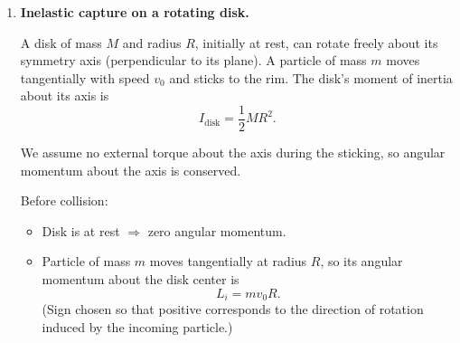 \documentclass[../main.tex]{subfiles}
\begin{document}
\begin{enumerate}
\begin{enumerate}
    Solve for $v(x)$:
    \[
    v^2(x)
    = \frac{2k}{m} \left( \frac{1}{\sqrt{x^2 + a^2}} - \frac{1}{\sqrt{x_0^2 + a^2}} \right),
    \]
    \[
    v(x)
    = \sqrt{ \frac{2k}{m} \left( \frac{1}{\sqrt{x^2 + a^2}} - \frac{1}{\sqrt{x_0^2 + a^2}} \right) }.
    \]

    Note: the expression in parentheses must be nonnegative for real $v$. Since the particle starts at $x_0>0$ and is attracted toward $x=0$, $x$ will decrease from $x_0$ toward $0$, and $1/\sqrt{x^2+a^2}$ increases as $|x|$ decreases.

    \item \textit{Maximum speed.}

    The speed increases as the particle moves to where the kinetic energy is largest. From the expression above, $v^2(x)$ is largest when
    \[
    \frac{1}{\sqrt{x^2 + a^2}}
    \quad\text{is largest.}
    \]
    That happens at the smallest possible $\sqrt{x^2+a^2}$, i.e. at $x=0$ (symmetric force will then decelerate it once it passes through and climbs ``up'' on the other side).

    Thus the maximum speed $v_{\max}$ occurs at $x=0$:
    \[
    v_{\max}^2
    = \frac{2k}{m} \left(
    \frac{1}{\sqrt{0 + a^2}} - \frac{1}{\sqrt{x_0^2 + a^2}}
    \right)
    = \frac{2k}{m} \left(
    \frac{1}{a} - \frac{1}{\sqrt{x_0^2 + a^2}}
    \right).
    \]

    Therefore
    \[
    v_{\max}
    = \sqrt{
    \frac{2k}{m} \left(
    \frac{1}{a} - \frac{1}{\sqrt{x_0^2 + a^2}}
    \right)
    }.
    \]

    Interpretation: the force pulls the particle toward the origin like a softened $1/r^2$-type attraction; the speed peaks at the center.
\end{enumerate}


\item \textbf{Inelastic capture on a rotating disk.}

A disk of mass $M$ and radius $R$, initially at rest, can rotate freely about its symmetry axis (perpendicular to its plane). A particle of mass $m$ moves tangentially with speed $v_0$ and sticks to the rim. The disk's moment of inertia about its axis is
\[
I_{\text{disk}} = \frac{1}{2} M R^2.
\]

We assume no external torque about the axis during the sticking, so angular momentum about the axis is conserved.

Before collision:
\begin{itemize}
\item Disk is at rest $\Rightarrow$ zero angular momentum.
\item Particle of mass $m$ moves tangentially at radius $R$, so its angular momentum about the disk center is
\[
L_i = m v_0 R.
\]
(Sign chosen so that positive corresponds to the direction of rotation induced by the incoming particle.)
\end{itemize}


\end{enumerate}
\end{document}
